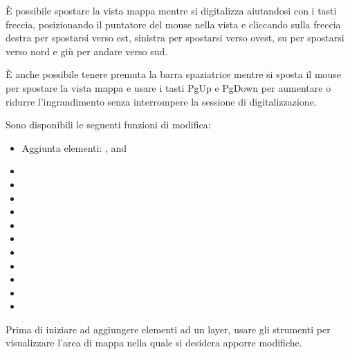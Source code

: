 
È possibile spostare la vista mappa mentre si digitalizza aiutandosi con i
tasti freccia, posizionando il puntatore del mouse nella vista e cliccando
sulla freccia destra per spostarsi verso est, sinistra per spostarsi verso ovest,
su per spostarsi verso nord e giù per andare verso sud.

È anche possibile tenere premuta la barra spaziatrice mentre si sposta il
mouse per spostare la vista mappa e usare i tasti PgUp e PgDown per aumentare
o ridurre l'ingrandimento senza interrompere la sessione di digitalizzazione.

Sono disponibili le seguenti funzioni di modifica:

\begin{itemize}
\item Aggiunta elementi: ,
   and
\item {}
\item {}
\item {}
\item {}
\item {}
\item {}
\item {}
\item {}
\item {}
\item {}
\item {}
\end{itemize}


Prima di iniziare ad aggiungere elementi ad un layer, usare gli strumenti
  
per visualizzare l'area di mappa nella quale si desidera apporre modifiche.

